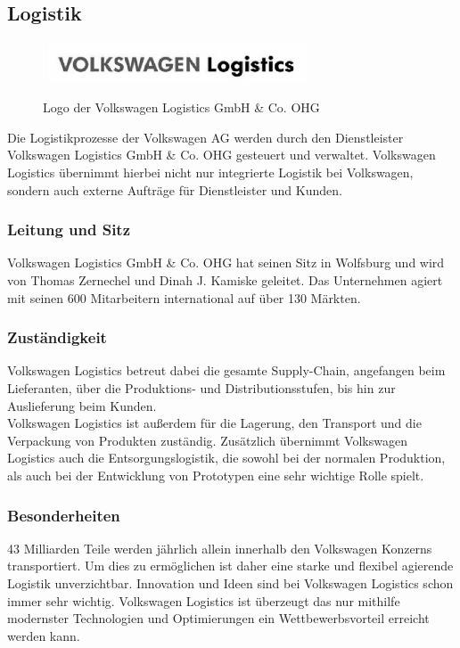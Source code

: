 \documentclass[12pt]{article}
\begin{document}
\subsection{Logistik}
\begin{figure}[here!]
	\centering
	\includegraphics[width=0.7\textwidth]{images/logologistics.jpg}
	\caption{Logo der Volkswagen Logistics GmbH \& Co. OHG}
	\label{fig:vwlogisticspic}
	\cite{vwlogisticspic}
\end{figure}\FloatBarrier
Die Logistikprozesse der Volkswagen AG werden durch den Dienstleister Volkswagen Logistics GmbH \& Co. OHG gesteuert und verwaltet.
Volkswagen Logistics übernimmt hierbei nicht nur integrierte Logistik bei Volkswagen, sondern auch externe Aufträge für Dienstleister und Kunden.\cite{vwlogistics}

\subsubsection{Leitung und Sitz}
Volkswagen Logistics GmbH \& Co. OHG hat seinen Sitz in Wolfsburg und wird von Thomas Zernechel und Dinah J. Kamiske geleitet.
Das Unternehmen agiert mit seinen 600 Mitarbeitern international auf über 130 Märkten.\cite{vwlogistics}

\subsubsection{Zuständigkeit}
Volkswagen Logistics betreut dabei die gesamte Supply-Chain, angefangen beim Lieferanten, über die Produktions- und Distributionsstufen, bis hin zur Auslieferung beim Kunden.\\
Volkswagen Logistics ist außerdem für die Lagerung, den Transport und die Verpackung von Produkten zuständig. Zusätzlich übernimmt Volkswagen Logistics auch die Entsorgungslogistik, die sowohl bei der normalen Produktion, als auch bei der Entwicklung von Prototypen eine sehr wichtige Rolle spielt.\cite{vwlogistics}

\subsubsection{Besonderheiten}
43 Milliarden Teile werden jährlich allein innerhalb den Volkswagen Konzerns transportiert. Um dies zu ermöglichen ist daher eine starke und flexibel agierende Logistik unverzichtbar.
Innovation und Ideen sind bei Volkswagen Logistics schon immer sehr wichtig. Volkswagen Logistics ist überzeugt das nur mithilfe modernster Technologien und Optimierungen ein Wettbewerbsvorteil erreicht werden kann.
\end{document}
